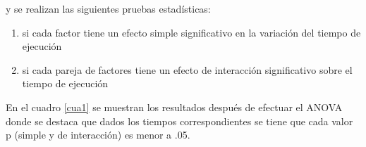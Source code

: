 \documentclass[12pt]{article}
\begin{document}
y se realizan las siguientes pruebas estadísticas:

\begin{enumerate}
\item si cada factor tiene un efecto simple significativo en la variación del tiempo de ejecución
\item si cada pareja de factores tiene un efecto de interacción significativo sobre el tiempo de ejecución
\end{enumerate}

En el cuadro \ref{cua1} se muestran los resultados después de efectuar el ANOVA donde se destaca que dados los tiempos correspondientes se tiene que cada valor p (simple y de interacción) es menor a .05.

\begin{table}[H] 
\vspace{-.1cm}
\caption{{\small Análisis de varianza del tiempo de ejecución.}}
\centering
{}
\end{table}
\end{document}
